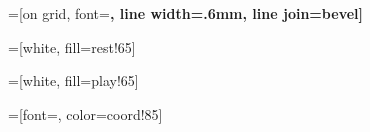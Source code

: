 


=[on grid,
                  font=\bfseries,
                  line width=.6mm,
                  line join=bevel]


=[white,
                  fill=rest!65]

=[white,
                  fill=play!65]


=[font=\Large,
                color=coord!85]




